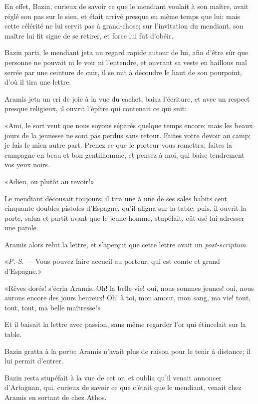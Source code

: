 En effet, Bazin, curieux de savoir ce que le mendiant voulait à son maître, avait réglé son pas sur le sien, et était arrivé presque en même temps que lui; mais cette célérité ne lui servit pas à grand-chose; sur l'invitation du mendiant, son maître lui fit signe de se retirer, et force lui fut d'obéir. 

Bazin parti, le mendiant jeta un regard rapide autour de lui, afin d'être sûr que personne ne pouvait ni le voir ni l'entendre, et ouvrant sa veste en haillons mal serrée par une ceinture de cuir, il se mit à découdre le haut de son pourpoint, d'où il tira une lettre. 

Aramis jeta un cri de joie à la vue du cachet, baisa l'écriture, et avec un respect presque religieux, il ouvrit l'épître qui contenait ce qui suit: 

«Ami, le sort veut que nous soyons séparés quelque temps encore; mais les beaux jours de la jeunesse ne sont pas perdus sans retour. Faites votre devoir au camp; je fais le mien autre part. Prenez ce que le porteur vous remettra; faites la campagne en beau et bon gentilhomme, et pensez à moi, qui baise tendrement vos yeux noirs. 

«Adieu, ou plutôt au revoir!» 

Le mendiant décousait toujours; il tira une à une de ses sales habits cent cinquante doubles pistoles d'Espagne, qu'il aligna sur la table; puis, il ouvrit la porte, salua et partit avant que le jeune homme, stupéfait, eût osé lui adresser une parole. 

Aramis alors relut la lettre, et s'aperçut que cette lettre avait un \textit{post-scriptum}. 

«\textit{P.-S}. --- Vous pouvez faire accueil au porteur, qui est comte et grand d'Espagne.» 

«Rêves dorés! s'écria Aramis. Oh! la belle vie! oui, nous sommes jeunes! oui, nous aurons encore des jours heureux! Oh! à toi, mon amour, mon sang, ma vie! tout, tout, tout, ma belle maîtresse!» 

Et il baisait la lettre avec passion, sans même regarder l'or qui étincelait sur la table. 

Bazin gratta à la porte; Aramis n'avait plus de raison pour le tenir à distance; il lui permit d'entrer. 

Bazin resta stupéfait à la vue de cet or, et oublia qu'il venait annoncer d'Artagnan, qui, curieux de savoir ce que c'était que le mendiant, venait chez Aramis en sortant de chez Athos. 

